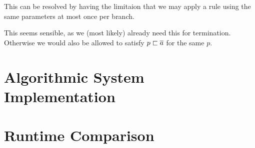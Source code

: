 \documentclass[a4paper]{article}
\begin{document}
This can be resolved by having the limitaion that we may apply
a rule using the same parameters at most once per branch.

This seems sensible, as we (most likely) already need this for termination.
Otherwise we would also be allowed to satisfy $p \sqsubset \overline{a}$ for the same $p$.

\section{Algorithmic System Implementation}
\wip

\section{Runtime Comparison}
\wip
\end{document}

